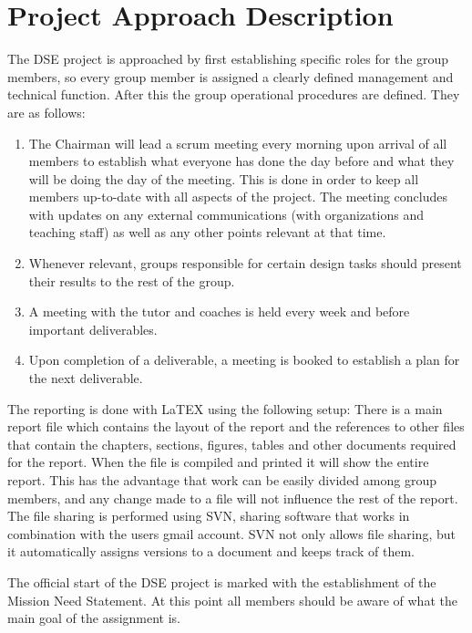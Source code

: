 \section{Project Approach Description}
\label{dseProjectApproachDescription}
The DSE project is approached by first establishing specific roles for the group members, so every group member is assigned a clearly defined management and technical function. After this the group operational procedures are defined. They are as follows:

\begin{enumerate}
	\item The Chairman will lead a scrum meeting every morning upon arrival of all members to establish what everyone has done the day before and what they will be doing the day of the meeting. This is done in order to keep all members up-to-date with all aspects of the project. The meeting concludes with updates on any external communications (with organizations and teaching staff) as well as any other points relevant at that time.
	\item Whenever relevant, groups responsible for certain design tasks should present their results to the rest of the group.
	\item A meeting with the tutor and coaches is held every week and before important deliverables.
	\item Upon completion of a deliverable, a meeting is booked to establish a plan for the next deliverable.  
\end{enumerate}

The reporting is done with LaTEX using the following setup: There is a main report file which contains the layout of the report and the references to other files that contain the chapters, sections, figures, tables and other documents required for the report. When the file is compiled and printed it will show the entire report.
This has the advantage that work can be easily divided among group members, and any change made to a file will not influence the rest of the report. The file sharing is performed using SVN, sharing software that works in combination with the users gmail account. SVN not only allows file sharing, but it automatically assigns versions to a document and keeps track of them.

The official start of the DSE project is marked with the establishment of the Mission Need Statement. At this point all members should be aware of what the main goal of the assignment is.

